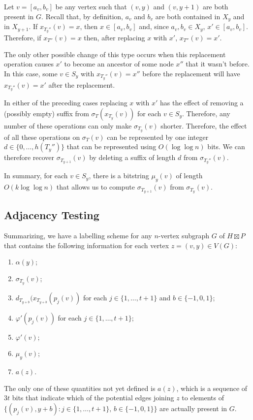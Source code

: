 \documentclass[kpfonts]{patmorin}
\begin{document}
Let $v=[a_v,b_v]$ be any vertex such that $(v,y)$ and $(v,y+1)$ are both present in $G$.  Recall that, by definition, $a_v$ and $b_v$ are both contained in $X_y$ and in $X_{y+1}$.  If $x_{T_y''}(v)=x$, then $x\in[a_v,b_v]$ and, since $a_v,b_v\in X_{y}$, $x'\in[a_v,b_v]$.  Therefore, if $x_{T''}(v)=x$ then, after replacing $x$ with $x'$, $x_{T''}(v)=x'$.  

The only other possible change of this type occurs when this replacement operation causes $x'$ to become an ancestor of some node $x''$ that it wasn't before.  In this case, some $v\in S_y$ with $x_{T_y''}(v)=x''$ before the replacement will have $x_{T_y''}(v)=x'$ after the replacement.

In either of the preceding cases replacing $x$ with $x'$ has the effect of removing a (possibly empty) suffix from $\sigma_T(x_{T_y}(v))$ for each $v\in S_y$.  Therefore, any number of these operations can only make $\sigma_{T_y}(v)$ shorter.  Therefore, the effect of all these operations on $\sigma_T(v)$ can be represented by one integer $d\in \{0,\ldots,h(T_y'')\}$ that can be represented using $O(\log\log n)$ bits.   We can therefore recover $\sigma_{T_{y+1}}(v)$ by deleting a suffix of length $d$ from $\sigma_{T_y''}(v)$.

In summary, for each $v\in S_y$, there is a bitstring $\mu_y(v)$ of length $O(k\log\log n)$ that allows us to compute $\sigma_{T_{y+1}}(v)$ from $\sigma_{T_y}(v)$.


\subsection{Adjacency Testing}

Summarizing, we have a labelling scheme for any $n$-vertex subgraph $G$ of $H\boxtimes P$ that contains the following information for each vertex $z=(v,y)\in V(G)$:

\begin{enumerate}[(PC1)]
  \item $\alpha(y)$; %
  \item $\sigma_{T_y}(v)$; %
  \item $d_{T_{y+b}}(x_{T_{y+b}}(p_j(v))$ for each $j\in\{1,\ldots,t+1\}$ and $b\in\{-1,0,1\}$; 
  \item $\varphi'(p_j(v))$ for each $j\in\{1,\ldots,t+1\}$;
  \item $\varphi'(v)$;
  \item $\mu_y(v)$;
  \item $a(z)$.
\end{enumerate}
The only one of these quantities not yet defined is $a(z)$, which is a sequence of $3t$ bits that indicate which of the potential edges joining $z$ to elements of $\{(p_j(v),y+b): j\in\{1,\ldots,t+1\},\, b\in\{-1,0,1\}\}$ are actually present in $G$.
\end{document}
